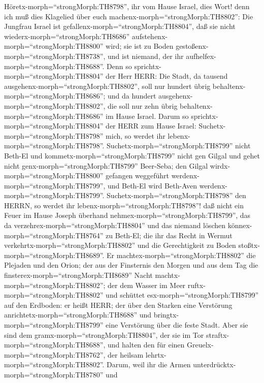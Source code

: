  Höretx-morph=``strongMorph:TH8798'', ihr vom Hause Israel,
dies Wort! denn ich muß dies Klagelied über euch
machenx-morph=``strongMorph:TH8802'':  Die Jungfrau Israel
ist gefallenx-morph=``strongMorph:TH8804'', daß sie nicht
wiederx-morph=``strongMorph:TH8686''
aufstehenx-morph=``strongMorph:TH8800'' wird; sie ist zu Boden
gestoßenx-morph=``strongMorph:TH8738'', und ist niemand, der ihr
aufhelfex-morph=``strongMorph:TH8688''.  Denn so
sprichtx-morph=``strongMorph:TH8804'' der Herr HERR: Die Stadt, da
tausend ausgehenx-morph=``strongMorph:TH8802'', soll nur hundert übrig
behaltenx-morph=``strongMorph:TH8686''; und da hundert
ausgehenx-morph=``strongMorph:TH8802'', die soll nur zehn übrig
behaltenx-morph=``strongMorph:TH8686'' im Hause Israel. 
Darum so sprichtx-morph=``strongMorph:TH8804'' der HERR zum Hause
Israel: Suchetx-morph=``strongMorph:TH8798'' mich, so werdet ihr
lebenx-morph=``strongMorph:TH8798''. 
Suchetx-morph=``strongMorph:TH8799'' nicht Beth-El und
kommetx-morph=``strongMorph:TH8799'' nicht gen Gilgal und gehet nicht
genx-morph=``strongMorph:TH8799'' Beer-Seba; den Gilgal
wirdx-morph=``strongMorph:TH8800'' gefangen weggeführt
werdenx-morph=``strongMorph:TH8799'', und Beth-El wird Beth-Aven
werdenx-morph=``strongMorph:TH8799''. 
Suchetx-morph=``strongMorph:TH8798'' den HERRN, so werdet ihr
lebenx-morph=``strongMorph:TH8798''! daß nicht ein Feuer im Hause Joseph
überhand nehmex-morph=``strongMorph:TH8799'', das da
verzehrex-morph=``strongMorph:TH8804'' und das niemand löschen
könnex-morph=``strongMorph:TH8764'' zu Beth-El;  die ihr das
Recht in Wermut verkehrtx-morph=``strongMorph:TH8802'' und die
Gerechtigkeit zu Boden stoßtx-morph=``strongMorph:TH8689''. 
Er machtex-morph=``strongMorph:TH8802'' die Plejaden und den Orion; der
aus der Finsternis den Morgen und aus dem Tag die
finsterex-morph=``strongMorph:TH8689'' Nacht
machtx-morph=``strongMorph:TH8802''; der dem Wasser im Meer
ruftx-morph=``strongMorph:TH8802'' und schüttet
esx-morph=``strongMorph:TH8799'' auf den Erdboden: er heißt HERR;
 der über den Starken eine Verstörung
anrichtetx-morph=``strongMorph:TH8688'' und
bringtx-morph=``strongMorph:TH8799'' eine Verstörung über die feste
Stadt.  Aber sie sind dem
gramx-morph=``strongMorph:TH8804'', der sie im Tor
straftx-morph=``strongMorph:TH8688'', und halten den für einen
Greuelx-morph=``strongMorph:TH8762'', der heilsam
lehrtx-morph=``strongMorph:TH8802''.  Darum, weil ihr die
Armen unterdrücktx-morph=``strongMorph:TH8780'' und
